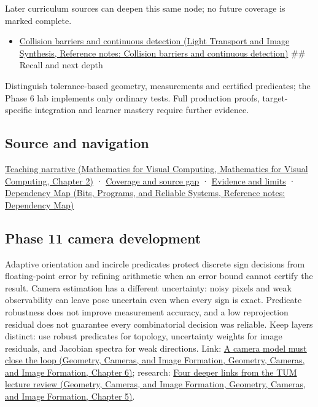 Later curriculum sources can deepen this same node; no future coverage is marked complete.

\begin{itemize}
\tightlist
\item
  \href{../04-Light-Transport-and-Image-Synthesis/main.pdf\#nameddest=appendix-a9ba01fa72a6}{Collision barriers and continuous detection (Light Transport and Image Synthesis, Reference notes: Collision barriers and continuous detection)} \#\# Recall and next depth
\end{itemize}

Distinguish tolerance-based geometry, measurements and certified predicates; the Phase 6 lab implements only ordinary tests. Full production proofs, target-specific integration and learner mastery require further evidence.

\subsection{Source and navigation}\label{appendix-341296fb3f64-source-and-navigation}

\href{../02-Mathematics-for-Visual-Computing/main.pdf\#nameddest=01-foundations-i-ch018-the-sensor-needs-coordinates-inside-the-triangle}{Teaching narrative (Mathematics for Visual Computing, Mathematics for Visual Computing, Chapter 2)} · \hyperref[appendix-fd090d982a15-phase-6---parts-501-600]{Coverage and source gap} · \hyperref[appendix-a103e7846d21-phase-6---source-analysis-and-verification]{Evidence and limits} · \href{../01-Bits-Programs-and-Reliable-Systems/main.pdf\#nameddest=appendix-4ad47bdd269a}{Dependency Map (Bits, Programs, and Reliable Systems, Reference notes: Dependency Map)}

\subsection{Phase 11 camera development}\label{appendix-341296fb3f64-phase-11-camera-development}

Adaptive orientation and incircle predicates protect discrete sign decisions from floating-point error by refining arithmetic when an error bound cannot certify the result. Camera estimation has a different uncertainty: noisy pixels and weak observability can leave pose uncertain even when every sign is exact. Predicate robustness does not improve measurement accuracy, and a low reprojection residual does not guarantee every combinatorial decision was reliable. Keep layers distinct: use robust predicates for topology, uncertainty weights for image residuals, and Jacobian spectra for weak directions. Link: \href{../03-Geometry-Cameras-and-Image-Formation/main.pdf\#nameddest=02-foundations-ii-ch037-a-camera-model-must-close-the-loop}{A camera model must close the loop (Geometry, Cameras, and Image Formation, Geometry, Cameras, and Image Formation, Chapter 6)}; research: \href{../03-Geometry-Cameras-and-Image-Formation/main.pdf\#nameddest=02-foundations-ii-ch036-four-deeper-links-from-the-tum-lecture-review}{Four deeper links from the TUM lecture review (Geometry, Cameras, and Image Formation, Geometry, Cameras, and Image Formation, Chapter 5)}.

